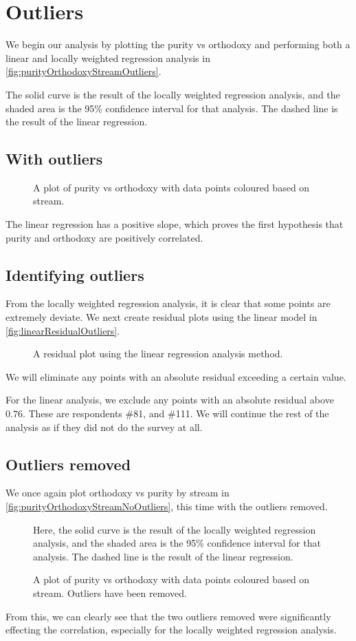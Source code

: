 \chapter{Outliers}\label{chap:outliers}

We begin our analysis by plotting the purity vs orthodoxy and performing both a linear and locally weighted regression analysis in \vref{fig:purityOrthodoxyStreamOutliers}.

The solid curve is the result of the locally weighted regression analysis, and the shaded area is the 95\% confidence interval for that analysis.
The dashed line is the result of the linear regression.

\section{With outliers}
\begin{figure}[H]
	\caption{A plot of purity vs orthodoxy with data points coloured based on stream.}
	\label{fig:purityOrthodoxyStreamOutliers}
\end{figure}

The linear regression has a positive slope, which proves the first hypothesis that purity and orthodoxy are positively correlated.

\section{Identifying outliers}
From the locally weighted regression analysis, it is clear that some points are extremely deviate.
We next create residual plots using the linear model in \vref{fig:linearResidualOutliers}.

\begin{figure}[H]
	\caption{A residual plot using the linear regression analysis method.}
	\label{fig:linearResidualOutliers}
\end{figure}

We will eliminate any points with an absolute residual exceeding a certain value.

For the linear analysis, we exclude any points with an absolute residual above $0.76$.
These are respondents \#81, and \#111.
We will continue the rest of the analysis as if they did not do the survey at all.

\section{Outliers removed}
We once again plot orthodoxy vs purity by stream in \vref{fig:purityOrthodoxyStreamNoOutliers}, this time with the outliers removed.
\begin{figure}[H]
	\caption{A plot of purity vs orthodoxy with data points coloured based on stream. Outliers have been removed.}
	\label{fig:purityOrthodoxyStreamNoOutliers}
	Here, the solid curve is the result of the locally weighted regression analysis, and the shaded area is the 95\% confidence interval for that analysis.
	The dashed line is the result of the linear regression.
\end{figure}

From this, we can clearly see that the two outliers removed were significantly effecting the correlation, especially for the locally weighted regression analysis.
